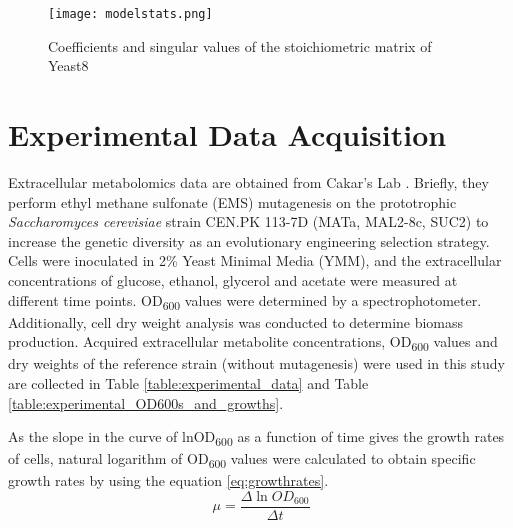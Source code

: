 \begin{figure}[H]
\begin{center}
\texttt{[image: modelstats.png]}
\end{center}
\caption[Coefficients and singular values of the stoichiometric matrix of Yeast8]{Coefficients and singular values of the stoichiometric matrix of Yeast8}
\label{fig:modelstats}
\end{figure}



\section{Experimental Data Acquisition} \label{experimentaldataacquisition}
Extracellular metabolomics data are obtained from Cakar's Lab \cite{arslan2018physiological}. Briefly, they perform ethyl methane sulfonate (EMS) mutagenesis  on the prototrophic \emph{Saccharomyces cerevisiae} strain CEN.PK 113-7D (MATa, MAL2-8c, SUC2) to increase the genetic diversity as an evolutionary engineering selection strategy. Cells were inoculated in 2\% Yeast Minimal Media (YMM), and the extracellular concentrations of glucose, ethanol, glycerol and acetate were measured at different time points. OD\textsubscript{600} values were determined by a spectrophotometer. Additionally, cell dry weight analysis was conducted to determine biomass production. Acquired extracellular metabolite concentrations, OD\textsubscript{600} values and dry weights of the reference strain (without mutagenesis) were used in this study are collected in Table \ref{table:experimental_data} and Table \ref{table:experimental_OD600s_and_growths}.




As the slope in the curve of lnOD\textsubscript{600} as a function of time gives the growth rates of cells, natural logarithm of OD\textsubscript{600} values were calculated to obtain specific growth rates by using the equation \ref{eq:growthrates}.
  \begin{equation}
      \ \mu = \frac{\Delta \ln{OD_{600}}}{\Delta t}
      \label{eq:growthrates}
  \end{equation}

